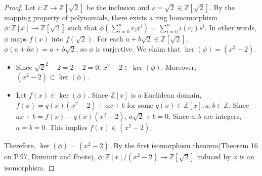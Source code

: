 \documentclass[12pt, psamsfonts]{amsart}
\theoremstyle{definition}
\theoremstyle{remark}
\numberwithin{equation}{section}
\begin{document}
\begin{proof}
  Let $i: \mathbb{Z} \rightarrow \mathbb{Z}[\sqrt{2}]$ be the inclusion and $s = \sqrt{2} \in \mathbb{Z}[\sqrt{2}]$.
  By the mapping property of polynomials, there exists a ring homomorphism $\phi: \mathbb{Z}[x] \rightarrow \mathbb{Z}[\sqrt{2}]$ such that $\phi(\sum_{i=0}^{n} r_ix^i) = \sum_{i=0}^{n} i(r_i)s^i$.
  In other words, $\phi$ maps $f(x)$ into $f(\sqrt{2})$.
  For each $a + b\sqrt{2} \in \mathbb{Z}[\sqrt{2}]$, $\phi(a + bx) = a + b\sqrt{2}$, so $\phi$ is surjective.
  We claim that $\ker(\phi) = (x^2 - 2)$.
  \begin{itemize}
    \item
      Since $\sqrt{2}^2 - 2 = 2 - 2 = 0$, $x^2 - 2 \in \ker(\phi)$.
      Moreover, $(x^2 - 2) \subset \ker(\phi)$.
    \item
      Let $f(x) \in \ker(\phi)$.
      Since $\mathbb{Z}[x]$ is a Euclidean domain, $f(x) = q(x)(x^2 - 2) + ax + b$ for some $q(x) \in \mathbb{Z}[x], a, b \in \mathbb{Z}$.
      Since $ax + b = f(x) - q(x)(x^2 - 2)$, $a\sqrt{2} + b = 0$.
      Since $a, b$ are integers, $a = b = 0$.
      This implies $f(x) \in (x^2 - 2)$.
  \end{itemize}
  Therefore, $\ker(\phi) = (x^2 - 2)$.
  By the first isomorphism theorem(Theorem 16 on P.97, Dummit and Foote), $\tilde{\phi} : \mathbb{Z}[x]/(x^2 - 2) \rightarrow \mathbb{Z}[\sqrt{2}]$ induced by $\phi$ is an isomorphism.


\end{proof}
\end{document}

